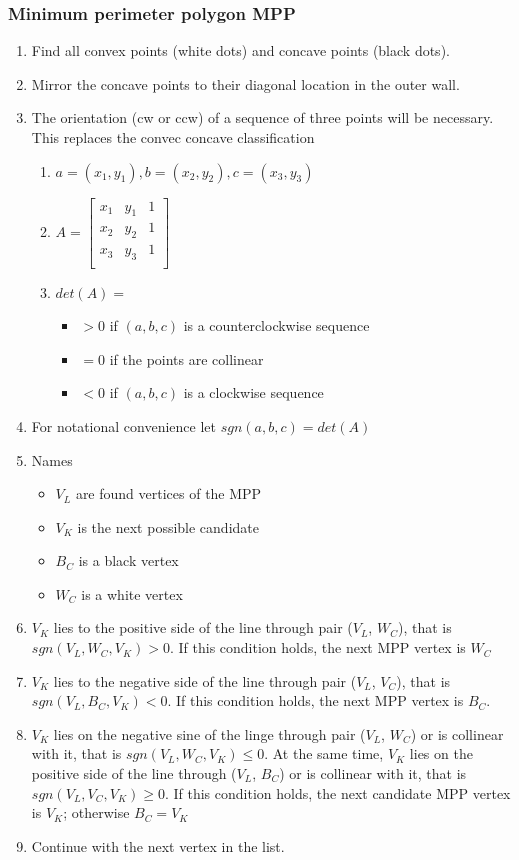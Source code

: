 \subsubsection{Minimum perimeter polygon MPP}
\begin{enumerate}
\item Find all convex points (white dots) and concave points (black dots).
\item Mirror the concave points to their diagonal location in the outer wall.
\item The orientation (cw or ccw) of a sequence of three points will be necessary. This replaces the convec concave classification
\begin{enumerate}
\item $a=(x_1, y_1), b=(x_2, y_2), c=(x_3, y_3)$
\item $A=\begin{bmatrix}
	x_1 & y_1 & 1\\
  	x_2 & y_2 & 1\\
  	x_3 & y_3 & 1\\
\end{bmatrix}$
\item $det(A) =$ 
\begin{itemize}
\item $> 0$ if $(a, b, c)$ is a counterclockwise sequence
\item $= 0$ if the points are collinear
\item $< 0$ if $(a, b, c)$ is a clockwise sequence
\end{itemize}
\end{enumerate}
\item For notational convenience let $sgn(a,b,c) = det(A)$
\item Names
\begin{itemize}
\item $V_L$ are found vertices of the MPP
\item $V_K$ is the next possible candidate
\item $B_C$ is a black vertex
\item $W_C$ is a white vertex
\end{itemize} 
\item $V_K$ lies to the positive side of the line through pair ($V_L$, $W_C$), that is $sgn(V_L, W_C, V_K)>0$. If this condition holds, the next MPP vertex is $W_C$
\item $V_K$ lies to the negative side of the line through pair ($V_L$, $V_C$), that is $sgn(V_L, B_C, V_K)<0$. If this condition holds, the next MPP vertex is $B_C$.
\item $V_K$ lies on the negative sine of the linge through pair ($V_L$, $W_C$) or is collinear with it, that is $sgn(V_L, W_C, V_K) \le 0$. At the same time, $V_K$ lies on the positive side of the line through ($V_L$, $B_C$) or is collinear with it, that is $sgn(V_L, V_C, V_K) \ge 0$. If this condition holds, the next candidate MPP vertex is $V_K$; otherwise $B_C = V_K$
\item Continue with the next vertex in the list.
\end{enumerate}
